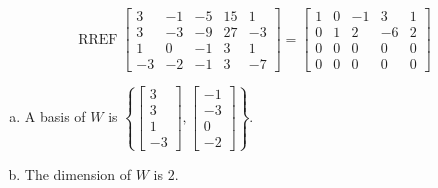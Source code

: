 \begin{exerciseAnswer} 


\[\operatorname{RREF} \left[\begin{array}{ccccc}
3 & -1 & -5 & 15 & 1 \\
3 & -3 & -9 & 27 & -3 \\
1 & 0 & -1 & 3 & 1 \\
-3 & -2 & -1 & 3 & -7
\end{array}\right] = \left[\begin{array}{ccccc}
1 & 0 & -1 & 3 & 1 \\
0 & 1 & 2 & -6 & 2 \\
0 & 0 & 0 & 0 & 0 \\
0 & 0 & 0 & 0 & 0
\end{array}\right] \]


\begin{enumerate}[(a)]
\item A basis of \(W\) is \( \left\{ \left[\begin{array}{c}
3 \\
3 \\
1 \\
-3
\end{array}\right] , \left[\begin{array}{c}
-1 \\
-3 \\
0 \\
-2
\end{array}\right] \right\} \).
\item The dimension of \(W\) is \( 2 \).
\end{enumerate}
    
\end{exerciseAnswer}
    
